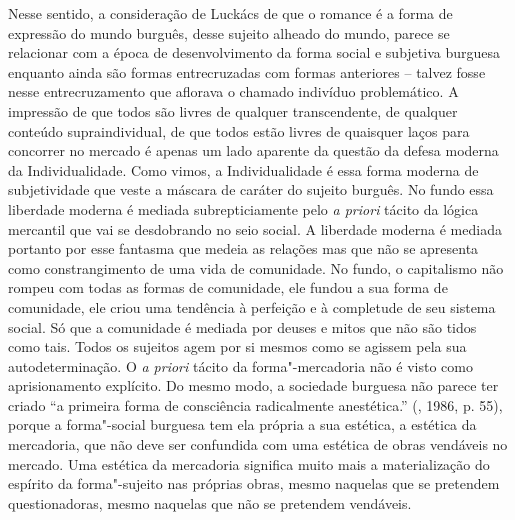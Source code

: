 Nesse sentido, a consideração de Luckács de que o romance é a forma de
expressão do mundo burguês, desse sujeito alheado do mundo, parece se
relacionar com a época de desenvolvimento da forma social e subjetiva
burguesa enquanto ainda são formas entrecruzadas com formas anteriores
-- talvez fosse nesse entrecruzamento que aflorava o chamado indivíduo
problemático. A impressão de que todos são livres de qualquer
transcendente, de qualquer conteúdo supraindividual, de que todos estão
livres de quaisquer laços para concorrer no mercado é apenas um lado
aparente da questão da defesa moderna da Individualidade. Como vimos, a
Individualidade é essa forma moderna de subjetividade que veste a
máscara de caráter do sujeito burguês. No fundo essa liberdade moderna é
mediada subrepticiamente pelo \emph{a priori} tácito da lógica mercantil
que vai se desdobrando no seio social. A liberdade moderna é mediada
portanto por esse fantasma que medeia as relações mas que não se
apresenta como constrangimento de uma vida de comunidade. No fundo, o
capitalismo não rompeu com todas as formas de comunidade, ele fundou a
sua forma de comunidade, ele criou uma tendência à perfeição e à
completude de seu sistema social. Só que a comunidade é mediada por
deuses e mitos que não são tidos como tais. Todos os sujeitos agem por
si mesmos como se agissem pela sua autodeterminação. O \emph{a priori}
tácito da forma"-mercadoria não é visto como aprisionamento explícito. Do
mesmo modo, a sociedade burguesa não parece ter criado ``a primeira
forma de consciência radicalmente anestética.'' (, 1986, p. 55),
porque a forma"-social burguesa tem ela própria a sua estética, a
estética da mercadoria, que não deve ser confundida com uma estética de
obras vendáveis no mercado. Uma estética da mercadoria significa muito
mais a materialização do espírito da forma"-sujeito nas próprias obras,
mesmo naquelas que se pretendem questionadoras, mesmo naquelas que não
se pretendem vendáveis.

